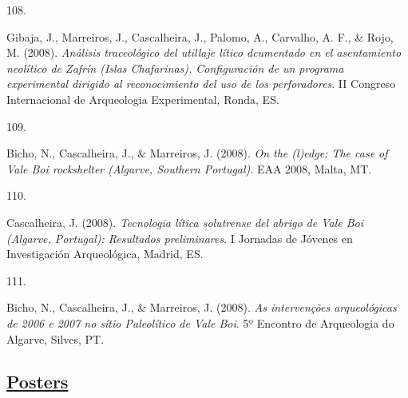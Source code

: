 \documentclass[11pt,a4paper,]{awesome-cv}
\newlength{\cslhangindent}
\newlength{\csllabelwidth}
\newenvironment{CSLReferences}[2] %
 {\begin{list}{}{%
  \setlength{\itemindent}{0pt}
  \setlength{\leftmargin}{0pt}
  \setlength{\parsep}{0pt}
  \ifodd #1
   \setlength{\leftmargin}{\cslhangindent}
   \setlength{\itemindent}{-1\cslhangindent}
  \fi
  \setlength{\itemsep}{#2\baselineskip}}}
 {\end{list}}
\newcommand{\CSLLeftMargin}[1]{\parbox[t]{\csllabelwidth}{\strut#1\strut}}
\newcommand{\CSLRightInline}[1]{\parbox[t]{\linewidth - \csllabelwidth}{\strut#1\strut}}
\begin{document}
\begin{CSLReferences}{0}{0}
\CSLLeftMargin{108. }%
\CSLRightInline{Gibaja, J., Marreiros, J., Cascalheira, J., Palomo, A.,
Carvalho, A. F., \& Rojo, M. (2008). \emph{Análisis traceológico del
utillaje lítico dcumentado en el asentamiento neolítico de Zafrín (Islas
Chafarinas). Configuración de un programa experimental dirigido al
reconocimiento del uso de los perforadores}. II Congreso Internacional
de Arqueologia Experimental, Ronda, ES.}

\CSLLeftMargin{109. }%
\CSLRightInline{Bicho, N., Cascalheira, J., \& Marreiros, J. (2008).
\emph{On the (l)edge: The case of Vale Boi rockshelter (Algarve,
Southern Portugal)}. EAA 2008, Malta, MT.}

\CSLLeftMargin{110. }%
\CSLRightInline{Cascalheira, J. (2008). \emph{Tecnologia lítica
solutrense del abrigo de Vale Boi (Algarve, Portugal): Resultados
preliminares}. I Jornadas de Jóvenes en Investigación Arqueológica,
Madrid, ES.}

\CSLLeftMargin{111. }%
\CSLRightInline{Bicho, N., Cascalheira, J., \& Marreiros, J. (2008).
\emph{As intervenções arqueológicas de 2006 e 2007 no sítio Paleolítico
de Vale Boi}. 5º Encontro de Arqueologia do Algarve, Silves, PT.}

\end{CSLReferences}

\subsection{\texorpdfstring{\ul{Posters}}{Posters}}\label{posters}
\end{document}
